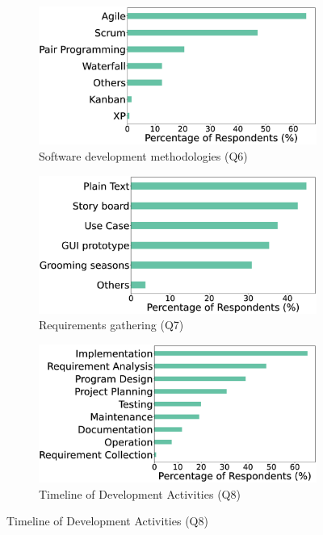\begin{figure}[t]
    \centering
    \caption{Software development methodologies used by the respondents}
    \begin{subfigure}{0.45\textwidth}
            \includegraphics[scale=0.1]{Figures/Respondents_Methodology}
            \caption{Software development methodologies (Q6)}
            \label{fig:methodologies}
    \end{subfigure}
    \begin{subfigure}{0.45\textwidth}
          \includegraphics[scale=0.1]{Figures/Requirements_Gathering}
          \caption{Requirements gathering (Q7)}
          \label{fig:requirements}
    \end{subfigure}
    \begin{subfigure}{0.6\textwidth}
          \includegraphics[scale=0.12]{Figures/Respondents_Activities}
          \caption{Timeline of Development Activities (Q8)}
          \label{fig:activities}
    \end{subfigure}
\end{figure}



